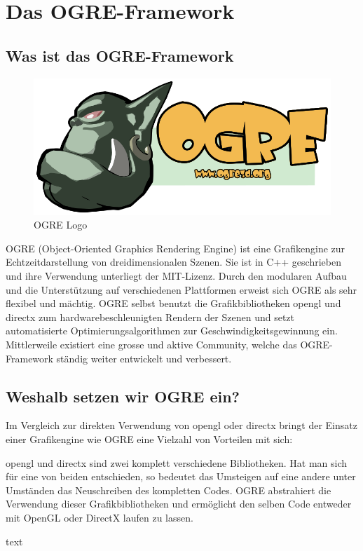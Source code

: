 \section{Das OGRE-Framework}

\subsection{Was ist das OGRE-Framework}

\begin{figure}
	\includegraphics[width=1\linewidth]{src/OgreLogo.png}
	\caption{OGRE Logo} %
	\label{OGRE Logo} %
\end{figure}

OGRE (Object-Oriented Graphics Rendering Engine) ist eine Grafikengine zur Echtzeitdarstellung von dreidimensionalen Szenen. Sie ist in C++ geschrieben und ihre Verwendung unterliegt der MIT-Lizenz. Durch den modularen Aufbau und die Unterstützung auf verschiedenen Plattformen erweist sich OGRE als sehr flexibel und mächtig. OGRE selbst benutzt die Grafikbibliotheken \gls{opengl} und \gls{directx} zum hardwarebeschleunigten Rendern der Szenen und setzt automatisierte Optimierungsalgorithmen zur Geschwindigkeitsgewinnung ein. Mittlerweile existiert eine grosse und aktive Community, welche das OGRE-Framework ständig weiter entwickelt und verbessert.

\subsection{Weshalb setzen wir OGRE ein?}

Im Vergleich zur direkten Verwendung von \gls{opengl} oder \gls{directx} bringt der Einsatz einer Grafikengine wie OGRE eine Vielzahl von Vorteilen mit sich:

 \gls{opengl} und \gls{directx} sind zwei komplett verschiedene Bibliotheken. Hat man sich für eine von beiden entschieden, so bedeutet das Umsteigen auf eine andere unter Umständen das Neuschreiben des kompletten Codes. OGRE abstrahiert die Verwendung dieser Grafikbibliotheken und ermöglicht den selben Code entweder mit OpenGL oder DirectX laufen zu lassen.

 text

